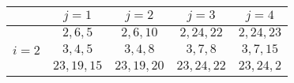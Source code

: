 \small
\begin{tabular}[b]{|c|c| c |c |c |}
\cline{2-5}
\multicolumn{1}{c|}{}&\multicolumn{1}{c}{\textbf{$j=1$}}&\multicolumn{1}{c}{\textbf{$j=2$}}&\multicolumn{1}{c}{\textbf{$j=3$}}&\multicolumn{1}{c|}{\textbf{$j=4$}}\\
\cline{2-4}
  \hline
\rowcolor{gray!10}\cellcolor{white}\multirow{1}{*}{$i=1$}&\multirow{1}{*}{$2,6,5$}&\multirow{1}{*}{$2,6,10$}&\multirow{1}{*}{$2,24,22$} &\multirow{1}{*}{$2,24,23$} \\ 
\multirow{1}{*}{$i=2$} &\multirow{1}{*}{$3,4,5$}&\multirow{1}{*}{$3,4,8$}& \multirow{1}{*}{$3,7,8$}&\multirow{1}{*}{$3,7,15$} \\
\rowcolor{gray!10}\cellcolor{white}\multirow{1}{*}{$i=3$}&
\multirow{1}{*}{$23,19,15$}&\multirow{1}{*}{$23,19,20$}&\multirow{1}{*}{$23,24,22$} &\multirow{1}{*}{$23,24,2$}\\
\hline
\end{tabular}